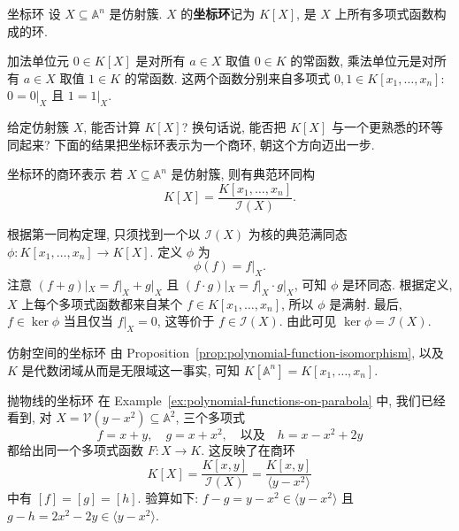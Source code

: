 \begin{Definition}{坐标环}\leavevmode\label{def:coordinate-ring}
  设 $X\subseteq\mathbb{A}^{n}$ 是仿射簇. $X$ 的\textbf{坐标环}记为 $K[X]$, 是 $X$ 上所有多项式函数构成的环.
\end{Definition}

加法单位元 $0\in K[X]$ 是对所有 $a\in X$ 取值 $0\in K$ 的常函数, 乘法单位元是对所有 $a\in X$ 取值 $1\in K$ 的常函数. 这两个函数分别来自多项式 $0,1\in K[x_{1},\ldots,x_{n}]$: $0=0|_{X}$ 且 $1=1|_{X}$.

给定仿射簇 $X$, 能否计算 $K[X]$? 换句话说, 能否把 $K[X]$ 与一个更熟悉的环等同起来? 下面的结果把坐标环表示为一个商环, 朝这个方向迈出一步.

\begin{Proposition}{坐标环的商环表示}\leavevmode\label{prop:coordinate-ring-as-quotient}
  若 $X\subseteq\mathbb{A}^{n}$ 是仿射簇, 则有典范环同构
  \[
    K[X]=\frac{K[x_{1},\ldots,x_{n}]}{\mathcal{I}(X)}.
  \]
\end{Proposition}

\begin{Proof}
  根据第一同构定理, 只须找到一个以 $\mathcal{I}(X)$ 为核的典范满同态 $\phi:K[x_{1},\ldots,x_{n}]\to K[X]$. 定义 $\phi$ 为
  \[
    \phi(f)=f|_{X}.
  \]
  注意 $(f+g)|_{X}=f|_{X}+g|_{X}$ 且 $(f\cdot g)|_{X}=f|_{X}\cdot g|_{X}$, 可知 $\phi$ 是环同态. 根据定义, $X$ 上每个多项式函数都来自某个 $f\in K[x_{1},\ldots,x_{n}]$, 所以 $\phi$ 是满射. 最后, $f\in\ker\phi$ 当且仅当 $f|_{X}=0$, 这等价于 $f\in\mathcal{I}(X)$. 由此可见 $\ker\phi=\mathcal{I}(X)$.
\end{Proof}

\begin{Example}{仿射空间的坐标环}\leavevmode\label{ex:coordinate-ring-of-affine-space}
  由 Proposition~\ref{prop:polynomial-function-isomorphism}, 以及 $K$ 是代数闭域从而是无限域这一事实, 可知 $K[\mathbb{A}^{n}]=K[x_{1},\ldots,x_{n}]$.
\end{Example}

\begin{Example}{抛物线的坐标环}\leavevmode\label{ex:coordinate-ring-of-parabola}
  在 Example~\ref{ex:polynomial-functions-on-parabola} 中, 我们已经看到, 对 $X=\mathcal{V}(y-x^{2})\subseteq\mathbb{A}^{2}$, 三个多项式
  \[
    f=x+y,\quad g=x+x^{2},\quad\text{以及}\quad h=x-x^{2}+2y
  \]
  都给出同一个多项式函数 $F:X\to K$. 这反映了在商环
  \[
    K[X]=\frac{K[x,y]}{\mathcal{I}(X)}=\frac{K[x,y]}{\langle y-x^{2}\rangle}
  \]
  中有 $[f]=[g]=[h]$. 验算如下: $f-g=y-x^{2}\in\langle y-x^{2}\rangle$ 且 $g-h=2x^{2}-2y\in\langle y-x^{2}\rangle$.
\end{Example}

